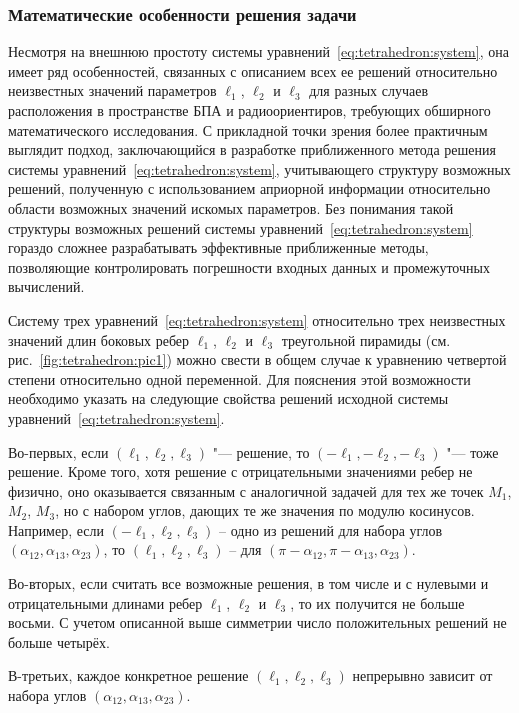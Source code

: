 \documentclass[../main.tex]{subfiles}
\begin{document}
\subsubsection{Математические особенности решения задачи}\label{sec:tetrahedron:math}
Несмотря на внешнюю простоту системы уравнений~\eqref{eq:tetrahedron:system}, она имеет ряд особенностей, связанных с описанием всех ее решений относительно неизвестных значений параметров $\ell_1$, $\ell_2$ и $\ell_3$ для разных случаев расположения в пространстве БПА и радиоориентиров, требующих обширного математического исследования. С прикладной точки зрения более практичным выглядит подход, заключающийся в разработке приближенного метода решения системы уравнений~\eqref{eq:tetrahedron:system}, учитывающего структуру возможных решений, полученную с использованием априорной информации относительно области возможных значений искомых параметров. Без понимания такой структуры возможных решений системы уравнений~\eqref{eq:tetrahedron:system} гораздо сложнее разрабатывать эффективные приближенные методы, позволяющие контролировать погрешности входных данных и промежуточных вычислений.

Систему трех уравнений~\eqref{eq:tetrahedron:system} относительно трех неизвестных значений длин боковых ребер $\ell_1$, $\ell_2$ и $\ell_3$ треугольной пирамиды (см. рис.~\ref{fig:tetrahedron:pic1}) можно свести в общем случае к уравнению четвертой степени относительно одной переменной. Для пояснения этой возможности необходимо указать на следующие свойства решений исходной системы уравнений~\eqref{eq:tetrahedron:system}.

Во-первых, если $\left(\ell_1, \ell_2, \ell_3\right)$ "--- решение, то $\left(-\ell_1, -\ell_2, -\ell_3\right)$ "--- тоже решение. Кроме того, хотя решение с отрицательными значениями ребер не физично, оно оказывается связанным с аналогичной задачей для тех же точек $M_1$, $M_2$, $M_3$, но с набором углов, дающих те же значения по модулю косинусов. Например, если $\left(-\ell_1, \ell_2, \ell_3\right)$ -- одно из решений для набора углов $\left(\alpha_{12}, \alpha_{13}, \alpha_{23}\right)$, то $\left(\ell_1, \ell_2, \ell_3\right)$ -- для $\left(\pi-\alpha_{12}, \pi-\alpha_{13}, \alpha_{23}\right)$.

Во-вторых, если считать все возможные решения, в том числе и с нулевыми и отрицательными длинами ребер $\ell_1$, $\ell_2$ и $\ell_3$, то их получится не больше восьми. С учетом описанной выше симметрии число положительных решений не больше четырёх.

В-третьих, каждое конкретное решение $\left(\ell_1, \ell_2, \ell_3\right)$ непрерывно зависит от набора углов $\left(\alpha_{12}, \alpha_{13}, \alpha_{23}\right)$.
\end{document}
